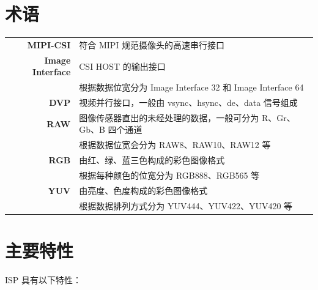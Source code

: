 \documentclass[main\_\_CN.tex]{subfiles}
\begin{document}
\section{术语}

\begin{longtable}[c]{ r l }
     \textbf{MIPI-CSI} & 符合 MIPI 规范摄像头的高速串行接口 \\
     \textbf{Image Interface} & CSI HOST 的输出接口 \\
                  & 根据数据位宽分为 Image Interface 32 和 Image Interface 64 \\
     \textbf{DVP} & 视频并行接口，一般由 vsync、hsync、de、data 信号组成 \\
     \textbf{RAW} & 图像传感器直出的未经处理的数据，一般可分为 R、Gr、Gb、B 四个通道 \\
                  & 根据数据位宽会分为 RAW8、RAW10、RAW12 等 \\
     \textbf{RGB} & 由红、绿、蓝三色构成的彩色图像格式 \\
                  & 根据每种颜色的位宽分为 RGB888、RGB565 等 \\
     \textbf{YUV} & 由亮度、色度构成的彩色图像格式 \\
                  & 根据数据排列方式分为 YUV444、YUV422、YUV420 等 \\
\end{longtable}


\section{主要特性}

ISP 具有以下特性：
\end{document}
